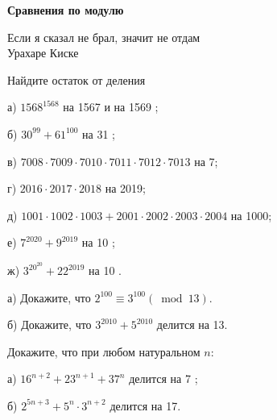 \centerline{\bf \Huge Сравнения по модулю}


\begin{flushright}
        \scriptsize{Если я сказал не брал, значит не отдам\\ Урахаре Киске}
\end{flushright}

Найдите остаток от деления

а) $1568^{1568}$ на 1567 и на 1569 ;


б) $30^{99}+61^{100}$ на 31 ;

в) $7008 \cdot 7009 \cdot 7010 \cdot 7011 \cdot 7012 \cdot 7013$ на 7;

г) $2016 \cdot 2017 \cdot 2018$ на 2019;

д) $1001 \cdot 1002 \cdot 1003+2001 \cdot 2002 \cdot 2003 \cdot 2004$ на 1000;

е) $7^{2020}+9^{2019}$ на 10 ;

ж) $3^{20^{20}}+22^{2019}$ на 10 .


а) Докажите, что $2^{100} \equiv 3^{100}(\bmod 13)$.

б) Докажите, что $3^{2010}+5^{2010}$ делится на 13.

Докажите, что при любом натуральном $n$:

а) $16^{n+2}+23^{n+1}+37^n$ делится на 7 ;

б) $2^{5 n+3}+5^n \cdot 3^{n+2}$ делится на 17.
